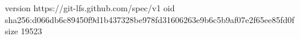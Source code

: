 version https://git-lfs.github.com/spec/v1
oid sha256:d066db6c89450f9d1b437328be978fd31606263e9b6c5b9af07e2f65ee85fd0f
size 19523

